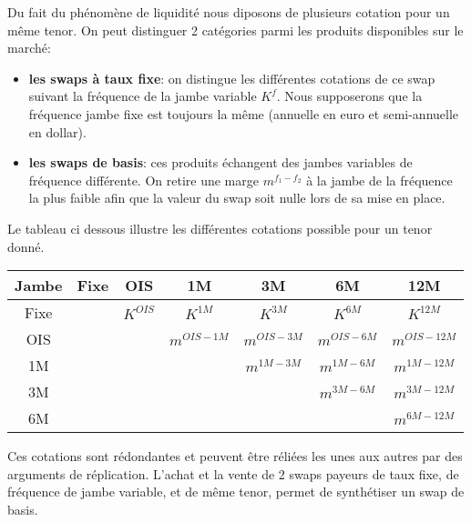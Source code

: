 \documentclass{article}
\begin{document}
Du fait du phénomène de liquidité nous diposons de plusieurs cotation pour un même tenor. On peut distinguer 2 catégories parmi les produits disponibles sur le marché:
\begin{itemize}
\item \textbf{les swaps à taux fixe}: on distingue les différentes cotations de ce swap suivant la fréquence de la jambe variable $K^f$. Nous supposerons que la fréquence jambe fixe est toujours la même (annuelle en euro et semi-annuelle en dollar).\\

\item \textbf{les swaps de basis}: ces produits échangent des jambes variables de fréquence différente. On retire une marge $m^{f_1-f_2}$ à la jambe de la fréquence la plus faible afin que la valeur du swap soit nulle lors de sa mise en place.\\ 

\end{itemize}

Le tableau ci dessous illustre les différentes cotations possible pour un tenor donné.

\begin{center}
\begin{tabular}{|c|c|c|c|c|c|c|}
\hline
Jambe&Fixe&OIS&1M&3M&6M&12M\\
\hline
Fixe&&$K^{OIS}$&$K^{1M}$&$K^{3M}$&$K^{6M}$&$K^{12M}$\\
OIS&&&$m^{OIS-1M}$&$m^{OIS-3M}$&$m^{OIS-6M}$&$m^{OIS-12M}$\\
1M&&&&$m^{1M-3M}$&$m^{1M-6M}$&$m^{1M-12M}$\\
3M&&&&&$m^{3M-6M}$&$m^{3M-12M}$\\
6M&&&&&&$m^{6M-12M}$\\
\hline
\end{tabular}
\end{center}

Ces cotations sont rédondantes et peuvent être réliées les unes aux autres par des arguments de réplication. L'achat et la vente de 2 swaps payeurs de taux fixe, de fréquence de jambe variable, et de même tenor, permet de synthétiser un swap de basis.\\
\end{document}
